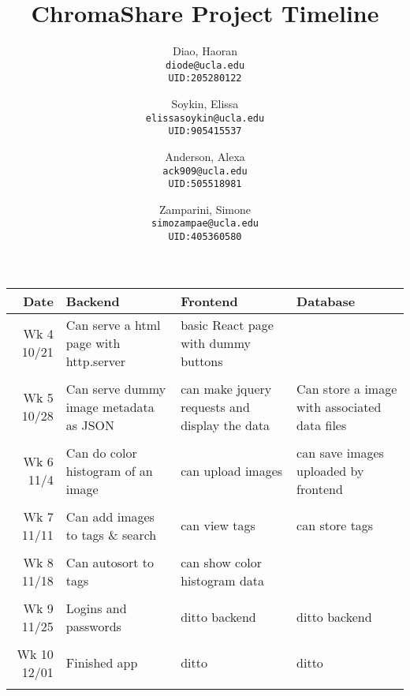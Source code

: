 \documentclass{article}
\title{ChromaShare Project Timeline}
\author {
	Diao, Haoran\\ \texttt{diode@ucla.edu}\\ \texttt{UID:205280122}
	\and
	Soykin, Elissa\\ \texttt{elissasoykin@ucla.edu}\\ \texttt{UID:905415537}
	\and
	Anderson, Alexa\\ \texttt{ack909@ucla.edu}\\ \texttt{UID:505518981}
	\and
	Zamparini, Simone\\ \texttt{simozampae@ucla.edu}\\ \texttt{UID:405360580}
}
\begin{document}
\maketitle
\begin{center}
\begin{tabular}{r | p{} p{} p{} }
Date		& Backend		& Frontend		& Database	\\
\hline
Wk 4 10/21	& Can serve a html page with http.server & basic React page with dummy buttons \\
\\
Wk 5 10/28	& Can serve dummy image metadata as JSON & can make jquery requests and display the data & Can store a image with associated data files \\
\\
Wk 6 11/4	& Can do color histogram of an image & can upload images & can save images uploaded by frontend \\
\\
Wk 7 11/11	& Can add images to tags \& search & can view tags & can store tags \\
\\
Wk 8 11/18	& Can autosort to tags & can show color histogram data \\
\\
Wk 9 11/25	& Logins and passwords & ditto backend & ditto backend \\
\\
Wk 10 12/01	& Finished app & ditto & ditto \\
\\
\end{tabular}
\end{center}
\end{document}
